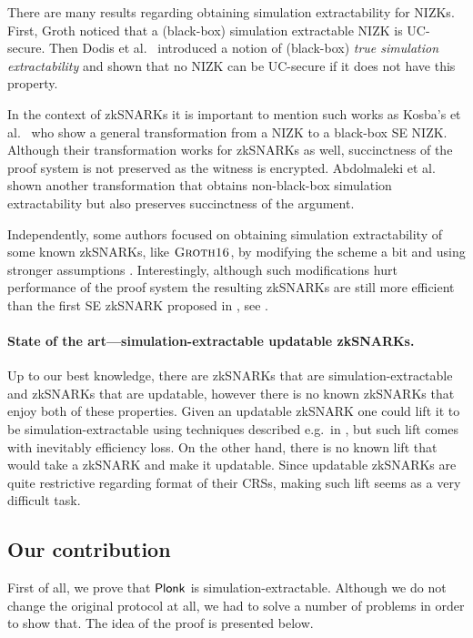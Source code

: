 \let\accentvec\vec \documentclass[runningheads,10pt]{llncs}
\begin{document}
There are many results regarding obtaining simulation extractability for NIZKs.
First, Groth \cite{AC:Groth07} noticed that a (black-box) simulation extractable
NIZK is UC-secure. Then Dodis et al.~\cite{AC:DHLW10} introduced a notion of
(black-box) \emph{true simulation extractability} and shown that no NIZK can be
UC-secure if it does not have this property. 

In the context of zkSNARKs it is important to mention such works as Kosba's et
al.~\cite{EPRINT:KZMQCP15} who show a general transformation from a NIZK
to a black-box SE NIZK. Although their transformation works for zkSNARKs
as well, succinctness of the proof system is not preserved as the witness
is encrypted. 
Abdolmaleki et al.~\cite{EPRINT:AbdRamSla20} shown another transformation that
obtains non-black-box simulation extractability but also preserves succinctness
of the argument.

Independently, some authors focused on obtaining simulation extractability of
some known zkSNARKs, like $\textsc{Groth16}$, by modifying the scheme a bit and using
stronger assumptions \cite{EPRINT:BowGab18,EPRINT:AtaBag19}. Interestingly,
although such modifications hurt performance of the proof system the resulting
zkSNARKs are still more efficient than the first SE zkSNARK proposed in
\cite{C:GroMal17}, see \cite{EPRINT:AtaBag19}. 

\paragraph{State of the art---simulation-extractable updatable zkSNARKs.} Up to
our best knowledge, there are zkSNARKs that are simulation-extractable and
zkSNARKs that are updatable, however there is no known zkSNARKs that enjoy both
of these properties.  Given an updatable zkSNARK one could lift it to be
simulation-extractable using techniques described e.g.~in
\cite{EPRINT:KZMQCP15,EPRINT:AbdRamSla20}, but such lift comes with inevitably efficiency loss.  On the other hand,
there is no known lift that would take a zkSNARK and make it updatable. Since
updatable zkSNARKs are quite restrictive regarding format of their CRSs, making
such lift seems as a very difficult task. 

\subsection{Our contribution} First of all, we prove that $\textnormal{\textsf{Plonk}}$ is
simulation-extractable. Although we do not change the original protocol at all,
we had to solve a number of problems in order to show that. The idea of the
proof is presented below. 
\end{document}
